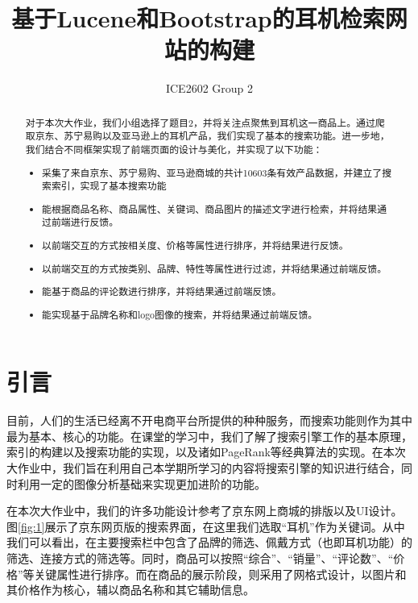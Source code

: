 \documentclass[a4paper,12pt]{article}
\title{基于Lucene和Bootstrap的耳机检索网站的构建}
\author{ICE2602 Group 2}
\begin{document}
    \maketitle

    \begin{abstract}
        对于本次大作业，我们小组选择了题目2，并将关注点聚焦到耳机这一商品上。通过爬取京东、苏宁易购以及亚马逊上的耳机产品，我们实现了基本的搜索功能。进一步地，我们结合不同框架实现了前端页面的设计与美化，并实现了以下功能：

        \begin{itemize}
            \item 采集了来自京东、苏宁易购、亚马逊商城的共计10603条有效产品数据，并建立了搜索索引，实现了基本搜索功能
            \item 能根据商品名称、商品属性、关键词、商品图片的描述文字进行检索，并将结果通过前端进行反馈。
            \item 以前端交互的方式按相关度、价格等属性进行排序，并将结果进行反馈。
            \item 以前端交互的方式按类别、品牌、特性等属性进行过滤，并将结果通过前端反馈。
            \item 能基于商品的评论数进行排序，并将结果通过前端反馈。
            \item 能实现基于品牌名称和logo图像的搜索，并将结果通过前端反馈。
        \end{itemize}
    \end{abstract}

    \newpage

    \tableofcontents

    \newpage

    \section{引言}

    目前，人们的生活已经离不开电商平台所提供的种种服务，而搜索功能则作为其中最为基本、核心的功能。在课堂的学习中，我们了解了搜索引擎工作的基本原理，索引的构建以及搜索功能的实现，以及诸如PageRank等经典算法的实现。在本次大作业中，我们旨在利用自己本学期所学习的内容将搜索引擎的知识进行结合，同时利用一定的图像分析基础来实现更加进阶的功能。

    在本次大作业中，我们的许多功能设计参考了京东网上商城的排版以及UI设计。图\ref{fig:1}展示了京东网页版的搜索界面，在这里我们选取“耳机”作为关键词。从中我们可以看出，在主要搜索栏中包含了品牌的筛选、佩戴方式（也即耳机功能）的筛选、连接方式的筛选等。同时，商品可以按照“综合”、“销量”、“评论数”、“价格”等关键属性进行排序。而在商品的展示阶段，则采用了网格式设计，以图片和其价格作为核心，辅以商品名称和其它辅助信息。
\end{document}
